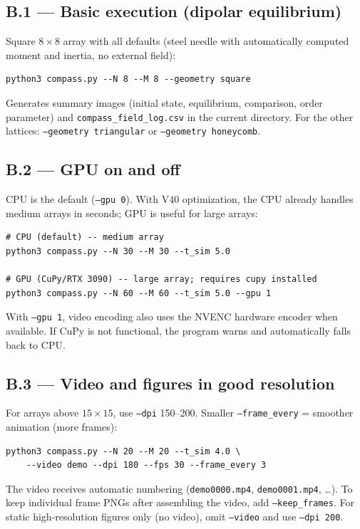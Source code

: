 \documentclass[11pt,a4paper]{article}
\newcommand{\code}[1]{\texttt{#1}}
\begin{document}
\subsection*{B.1 --- Basic execution (dipolar equilibrium)}

Square $8\times8$ array with all defaults (steel needle with automatically computed moment and inertia, no external field):
\begin{verbatim}
python3 compass.py --N 8 --M 8 --geometry square
\end{verbatim}
Generates summary images (initial state, equilibrium, comparison, order parameter) and \code{compass\_field\_log.csv} in the current directory. For the other lattices: \code{--geometry triangular} or \code{--geometry honeycomb}.

\subsection*{B.2 --- GPU on and off}

CPU is the default (\code{--gpu 0}). With V40 optimization, the CPU already handles medium arrays in seconds; GPU is useful for large arrays:
\begin{verbatim}
# CPU (default) -- medium array
python3 compass.py --N 30 --M 30 --t_sim 5.0

# GPU (CuPy/RTX 3090) -- large array; requires cupy installed
python3 compass.py --N 60 --M 60 --t_sim 5.0 --gpu 1
\end{verbatim}
With \code{--gpu 1}, video encoding also uses the NVENC hardware encoder when available. If CuPy is not functional, the program warns and automatically falls back to CPU.

\subsection*{B.3 --- Video and figures in good resolution}

For arrays above $15\times15$, use \code{--dpi} 150--200. Smaller \code{--frame\_every} = smoother animation (more frames):
\begin{verbatim}
python3 compass.py --N 20 --M 20 --t_sim 4.0 \
    --video demo --dpi 180 --fps 30 --frame_every 3
\end{verbatim}
The video receives automatic numbering (\code{demo0000.mp4}, \code{demo0001.mp4}, \dots). To keep individual frame PNGs after assembling the video, add \code{--keep\_frames}. For static high-resolution figures only (no video), omit \code{--video} and use \code{--dpi 200}.
\end{document}
